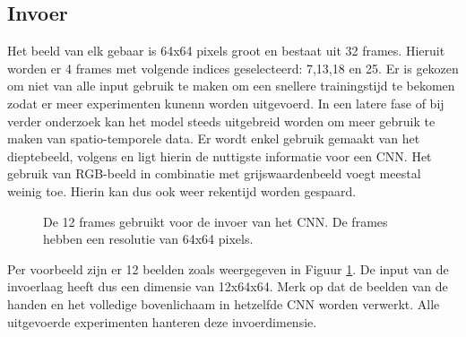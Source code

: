 \subsection{Invoer}
Het beeld van elk gebaar is 64x64 pixels groot en bestaat uit 32 frames. Hieruit worden er 4 frames met volgende indices geselecteerd: 7,13,18 en 25. Er is gekozen om niet van alle input gebruik te maken om een snellere trainingstijd te bekomen zodat er meer experimenten kunenn worden uitgevoerd. In een latere fase of bij verder onderzoek kan het model steeds uitgebreid worden om meer gebruik te maken van spatio-temporele data.
\npar Er wordt enkel gebruik gemaakt van het dieptebeeld, volgens \cite{lionel} en \cite{wu_deep_2014} ligt hierin de nuttigste informatie voor een CNN. Het gebruik van RGB-beeld in combinatie met grijswaardenbeeld voegt meestal weinig toe. Hierin kan dus ook weer rekentijd worden gespaard.
\begin{figure}
	\centering
	\def\svgwidth{0.5\columnwidth}
	
	\caption{De 12 frames gebruikt voor de invoer van het CNN. De frames hebben een resolutie van 64x64 pixels.}
	\label{fig:dataset-input}
\end{figure}
\npar Per voorbeeld zijn er 12 beelden zoals weergegeven in Figuur \ref{fig:dataset-input}. De input van de invoerlaag heeft dus een dimensie van 12x64x64. Merk op dat de beelden van de handen en het volledige bovenlichaam in hetzelfde CNN worden verwerkt. Alle uitgevoerde experimenten hanteren deze invoerdimensie.

